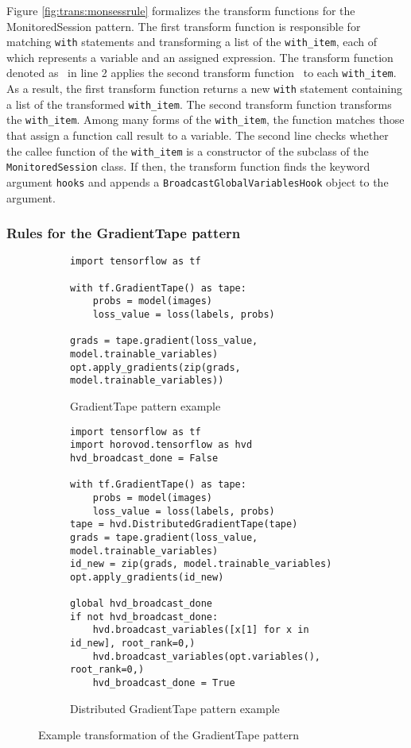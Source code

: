 
Figure \ref{fig:trans:monsessrule} formalizes the transform functions for the
MonitoredSession pattern.
The first transform function is responsible for matching {\tt with} statements
and transforming a list of the {\tt with\_item}, each of which represents a
variable and an assigned expression. 
The transform function denoted as \fkwwithitem~in line 2 applies the second
transform function \fkwithitem~to each {\tt with\_item}.
As a result, the first transform function returns a new {\tt with} statement
containing a list of the transformed {\tt with\_item}.
The second transform function transforms the {\tt with\_item}.
Among many forms of the {\tt with\_item}, the function matches those that
assign a function call result to a variable.
The second line checks whether the callee function of the {\tt with\_item} is a
constructor of the subclass of the {\tt MonitoredSession} class. 
If then, the transform function finds the keyword argument {\tt hooks} and
appends a {\tt BroadcastGlobalVariablesHook} object to the argument.

\subsubsection{Rules for the GradientTape pattern}\label{sec:grad}

\begin{figure}[ht!]
  \centering
  \begin{subfigure}[t]{0.4\textwidth}
    \begin{lstlisting}[style=mpython]
import tensorflow as tf

with tf.GradientTape() as tape:
    probs = model(images)
    loss_value = loss(labels, probs)

grads = tape.gradient(loss_value, model.trainable_variables)
opt.apply_gradients(zip(grads, model.trainable_variables))\end{lstlisting}
    \caption{GradientTape pattern example}
  \end{subfigure}
  \hspace{5mm}
  \begin{subfigure}[t]{0.55\textwidth}
    \begin{lstlisting}[style=mpython]
import tensorflow as tf
import horovod.tensorflow as hvd
hvd_broadcast_done = False

with tf.GradientTape() as tape:
    probs = model(images)
    loss_value = loss(labels, probs)
tape = hvd.DistributedGradientTape(tape)
grads = tape.gradient(loss_value, model.trainable_variables)
id_new = zip(grads, model.trainable_variables)
opt.apply_gradients(id_new)

global hvd_broadcast_done
if not hvd_broadcast_done:
    hvd.broadcast_variables([x[1] for x in id_new], root_rank=0,)
    hvd.broadcast_variables(opt.variables(), root_rank=0,)
    hvd_broadcast_done = True\end{lstlisting}
    \caption{Distributed GradientTape pattern example}
  \end{subfigure}
  \caption{Example transformation of the GradientTape pattern}
  \label{fig:trans:gtapetrans}
\end{figure}


